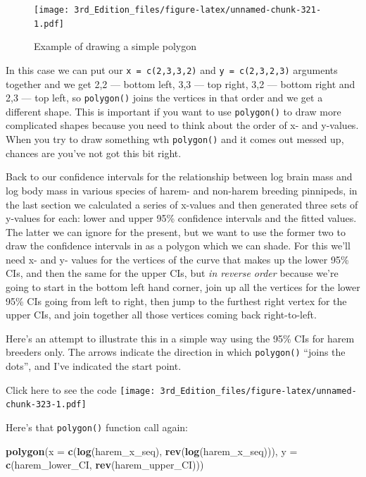 \documentclass[
]{book}
\newenvironment{Shaded}{\begin{snugshade}}{\end{snugshade}}
\newcommand{\DataTypeTok}[1]{\textcolor[rgb]{0.13,0.29,0.53}{#1}}
\newcommand{\KeywordTok}[1]{\textcolor[rgb]{0.13,0.29,0.53}{\textbf{#1}}}
\newcommand{\NormalTok}[1]{#1}
\begin{document}
\begin{figure}
\centering
\texttt{[image: 3rd\_Edition\_files/figure-latex/unnamed-chunk-321-1.pdf]}
\caption{\label{fig:unnamed-chunk-321}Example of drawing a simple polygon}
\end{figure}

In this case we can put our \texttt{x\ =\ c(2,3,3,2)} and \texttt{y\ =\ c(2,3,2,3)} arguments together and we get 2,2 --- bottom left, 3,3 --- top right, 3,2 --- bottom right and 2,3 --- top left, so \texttt{polygon()} joins the vertices in that order and we get a different shape. This is important if you want to use \texttt{polygon()} to draw more complicated shapes because you need to think about the order of x- and y-values. When you try to draw something wth \texttt{polygon()} and it comes out messed up, chances are you've not got this bit right.

Back to our confidence intervals for the relationship between log brain mass and log body mass in various species of harem- and non-harem breeding pinnipeds, in the last section we calculated a series of x-values and then generated three sets of y-values for each: lower and upper 95\% confidence intervals and the fitted values. The latter we can ignore for the present, but we want to use the former two to draw the confidence intervals in as a polygon which we can shade. For this we'll need x- and y- values for the vertices of the curve that makes up the lower 95\% CIs, and then the same for the upper CIs, but \emph{in reverse order} because we're going to start in the bottom left hand corner, join up all the vertices for the lower 95\% CIs going from left to right, then jump to the furthest right vertex for the upper CIs, and join together all those vertices coming back right-to-left.

Here's an attempt to illustrate this in a simple way using the 95\% CIs for harem breeders only. The arrows indicate the direction in which \texttt{polygon()} ``joins the dots'', and I've indicated the start point.

Click here to see the code
\texttt{[image: 3rd\_Edition\_files/figure-latex/unnamed-chunk-323-1.pdf]}

Here's that \texttt{polygon()} function call again:

\begin{Shaded}
\begin{Highlighting}[]
\KeywordTok{polygon}\NormalTok{(}\DataTypeTok{x =} \KeywordTok{c}\NormalTok{(}\KeywordTok{log}\NormalTok{(harem_x_seq), }\KeywordTok{rev}\NormalTok{(}\KeywordTok{log}\NormalTok{(harem_x_seq))), }
        \DataTypeTok{y =} \KeywordTok{c}\NormalTok{(harem_lower_CI, }\KeywordTok{rev}\NormalTok{(harem_upper_CI)))}
\end{Highlighting}
\end{Shaded}
\end{document}
